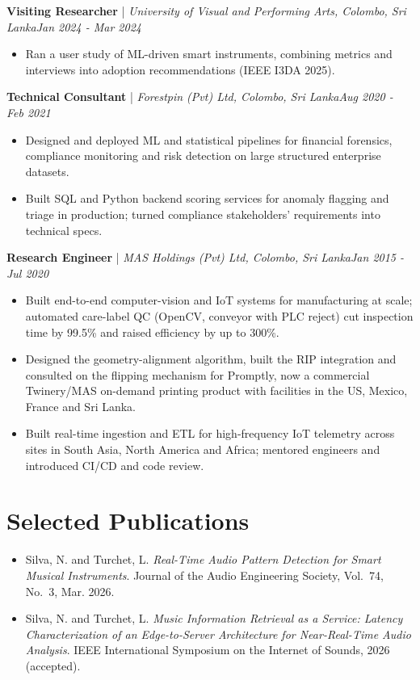 \documentclass[11pt]{article}
\newenvironment{cvrole}[5]{%
  \par\noindent\textbf{\large #1} | \textit{\small #2, #3}\hfill \textit{\small #4 - #5}\par
  \begin{itemize}[leftmargin=2em, itemsep=-0.3em, topsep=-0.5em]%
}{%
  \end{itemize}\par\noindent\mbox{}\par\vspace{0.1em}%
}
\begin{document}
\begin{cvrole}{Visiting Researcher}{University of Visual and Performing Arts}{Colombo, Sri Lanka}{Jan 2024}{Mar 2024}
    \item Ran a user study of ML-driven smart instruments, combining metrics and interviews into adoption recommendations (IEEE I3DA 2025).
\end{cvrole}

\begin{cvrole}{Technical Consultant}{Forestpin (Pvt) Ltd}{Colombo, Sri Lanka}{Aug 2020}{Feb 2021}
    \item Designed and deployed ML and statistical pipelines for financial forensics, compliance monitoring and risk detection on large structured enterprise datasets.
    \item Built SQL and Python backend scoring services for anomaly flagging and triage in production; turned compliance stakeholders' requirements into technical specs.
\end{cvrole}

\begin{cvrole}{Research Engineer}{MAS Holdings (Pvt) Ltd}{Colombo, Sri Lanka}{Jan 2015}{Jul 2020}
    \item Built end-to-end computer-vision and IoT systems for manufacturing at scale; automated care-label QC (OpenCV, conveyor with PLC reject) cut inspection time by 99.5\% and raised efficiency by up to 300\%.
    \item Designed the geometry-alignment algorithm, built the RIP integration and consulted on the flipping mechanism for Promptly, now a commercial Twinery/MAS on-demand printing product with facilities in the US, Mexico, France and Sri Lanka.
    \item Built real-time ingestion and ETL for high-frequency IoT telemetry across sites in South Asia, North America and Africa; mentored engineers and introduced CI/CD and code review.
\end{cvrole}

\enlargethispage{3\baselineskip}
\section*{Selected Publications \footnotesize {}}
\begin{itemize}[leftmargin=1.2em, itemsep=-0.25em]
    \item Silva, N. and Turchet, L. \textit{Real-Time Audio Pattern Detection for Smart Musical Instruments}. Journal of the Audio Engineering Society, Vol.~74, No.~3, Mar. 2026.
    \item Silva, N. and Turchet, L. \textit{Music Information Retrieval as a Service: Latency Characterization of an Edge-to-Server Architecture for Near-Real-Time Audio Analysis}. IEEE International Symposium on the Internet of Sounds, 2026 (accepted).
\end{itemize}
\end{document}
